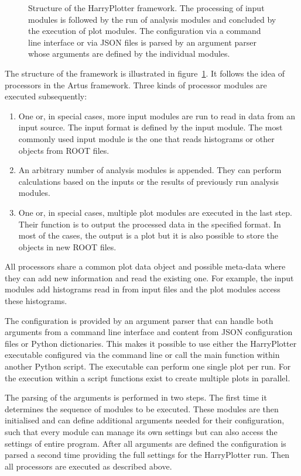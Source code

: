 \documentclass[3p]{elsarticle}
\begin{document}
\begin{figure}[htb]
\centering 
\caption{Structure of the HarryPlotter framework. The processing of input modules is followed by the run of analysis modules and concluded by the execution of plot modules. The configuration via a command line interface or via JSON files is parsed by an argument parser whose arguments are defined by the individual modules.}
\label{figure_artus_harry_plotter}
\end{figure}

The structure of the framework is illustrated in figure~\ref{figure_artus_harry_plotter}. It follows the idea of processors in the Artus framework. Three kinds of processor modules are executed subsequently:
\begin{enumerate}
\item One or, in special cases, more input modules are run to read in data from an input source. The input format is defined by the input module. The most commonly used input module is the one that reads histograms or other objects from ROOT files.
\item An arbitrary number of analysis modules is appended. They can perform calculations based on the inputs or the results of previously run analysis modules.
\item One or, in special cases, multiple plot modules are executed in the last step. Their function is to output the processed data in the specified format. In most of the cases, the output is a plot but it is also possible to store the objects in new ROOT files.
\end{enumerate}
All processors share a common plot data object and possible meta-data where they can add new information and read the existing one. For example, the input modules add histograms read in from input files and the plot modules access these histograms.

The configuration is provided by an argument parser that can handle both arguments from a command line interface and content from JSON configuration files or Python dictionaries. This makes it possible to use either the HarryPlotter executable configured via the command line or call the main function within another Python script. The executable can perform one single plot per run. For the execution within a script functions exist to create multiple plots in parallel.

The parsing of the arguments is performed in two steps. The first time it determines the sequence of modules to be executed. These modules are then initialised and can define additional arguments needed for their configuration, such that every module can manage its own settings but can also access the settings of entire program. After all arguments are defined the configuration is parsed a second time providing the full settings for the HarryPlotter run. Then all processors are executed as described above.
\end{document}

